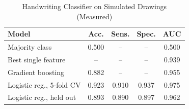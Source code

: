 \begin{table}[t]
\centering
\caption{Handwriting Classifier on Simulated Drawings (Measured)}
\label{tab:hw}
\footnotesize
\begin{tabular}{@{}p{3.55cm}cccc@{}}
\toprule
Model & Acc. & Sens. & Spec. & AUC \\
\midrule
Majority class & 0.500 & -- & -- & 0.500 \\
Best single feature & -- & -- & -- & 0.939 \\
Gradient boosting & 0.882 & -- & -- & 0.955 \\
Logistic reg., 5-fold CV & 0.923 & 0.910 & 0.937 & 0.975 \\
Logistic reg., held out & 0.893 & 0.890 & 0.897 & 0.962 \\
\bottomrule
\end{tabular}
\end{table}
